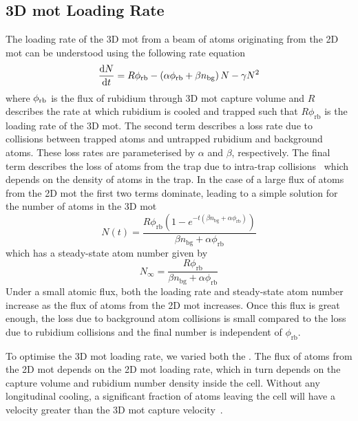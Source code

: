 \subsection{3D \ac{mot} Loading Rate}\label{subsec:loading_rate}

The loading rate of the 3D \ac{mot} from a beam of atoms originating from the 2D
\ac{mot} can be understood using the following rate equation
\begin{equation}
	\frac{\mathrm{d} N}{\mathrm{d}t} = R  \phi_\textnormal{rb} - \left(\alpha \phi_\textnormal{rb}  + \beta n_\textnormal{bg} \right) N - \gamma N^2
	\label{eq:loading_rate}
\end{equation}
where \(\phi_\textnormal{rb}\) is the flux of rubidium through 3D \ac{mot} capture volume and \(R\) describes the rate at which rubidium is cooled and trapped such that \( R \phi_\text{rb}\) is the loading rate of the 3D \ac{mot}. The second term describes a loss rate due to collisions between trapped atoms and untrapped rubidium and
background atoms. These loss rates are parameterised by \(\alpha\) and
\(\beta\), respectively. The final term describes the loss of atoms from the trap due to intra-trap collisions~\cite{Prentiss1988} which depends on the density of atoms in the trap. In the case of a large flux of atoms from the 2D \ac{mot} the first two terms dominate, leading to a simple solution for the number of atoms in the 3D \ac{mot}
\begin{equation}
	N(t) = \frac{R \phi _{\text{rb}} \left(1-e^{-t \left(\beta  n_{\text{bg}}+\alpha  \phi _{\text{rb}}\right)}\right)}{\beta  n_{\text{bg}}+\alpha  \phi _{\text{rb}}}
	\label{eq:atom_number}
\end{equation}
which has a steady-state atom number given by 
\begin{equation}
	N_\infty = \frac{R \phi _{\text{rb}}}{\beta  n_{\text{bg}}+\alpha  \phi _{\text{rb}}}
\end{equation}
Under a small atomic flux, both the loading rate and steady-state atom number increase as the flux of atoms from the 2D \ac{mot} increases. Once this flux is great enough, the loss due to background atom collisions is small compared to the loss due to rubidium collisions and the final number is independent of \(\phi_\text{rb}\).
\par\noindent
To optimise the 3D \ac{mot} loading rate, we varied both the . The flux of atoms from the 2D \ac{mot} depends on the 2D \ac{mot} loading rate, which in turn depends on the capture volume and rubidium number density inside the cell.  Without any longitudinal cooling, a significant fraction of atoms leaving the cell will have a velocity greater than the 3D \ac{mot} capture velocity~\cite{Schoser2002}. 
